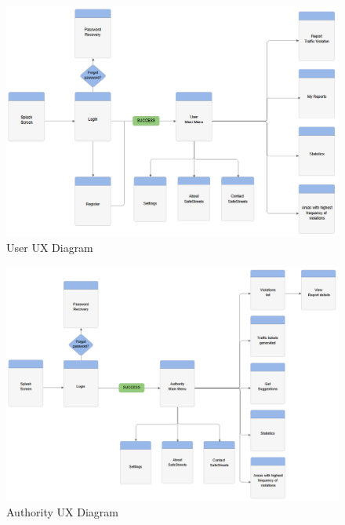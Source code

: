 \begin{figure}[H]
    \advance\leftskip-2.3cm
    \includegraphics[width=1.4\textwidth,left]{Images/user_experience.png}
    \caption{User UX Diagram}
\end{figure}

\begin{figure}[H]
    \advance\leftskip-2.3cm
    \includegraphics[width=1.4\textwidth,left]{Images/auth_experience.png}
    \caption{Authority UX Diagram}
\end{figure}